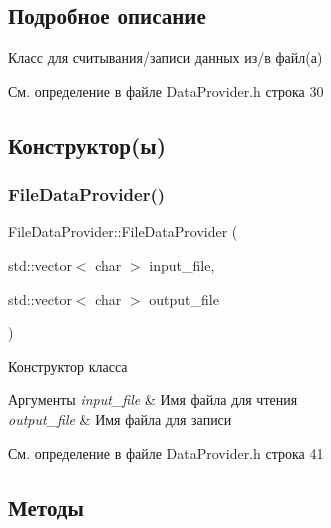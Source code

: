 \subsection{Подробное описание}
Класс для считывания/записи данных из/в файл(а) 

См. определение в файле Data\+Provider.\+h строка 30



\subsection{Конструктор(ы)}
\mbox{\label{class_file_data_provider_a993b0c05a33d57eeb96c9269fc4479a5}} 
\subsubsection{\texorpdfstring{File\+Data\+Provider()}{FileDataProvider()}}
{\footnotesize\ttfamily File\+Data\+Provider\+::\+File\+Data\+Provider (\begin{DoxyParamCaption}\item[{std\+::vector$<$ char $>$}]{input\+\_\+file,  }\item[{std\+::vector$<$ char $>$}]{output\+\_\+file }\end{DoxyParamCaption})\hspace{0.3cm}{\ttfamily [inline]}}



Конструктор класса 


\begin{DoxyParams}{Аргументы}
{\em input\+\_\+file} & Имя файла для чтения \\
\hline
{\em output\+\_\+file} & Имя файла для записи \\
\hline
\end{DoxyParams}


См. определение в файле Data\+Provider.\+h строка 41



\subsection{Методы}
\mbox{\label{class_file_data_provider_a3804f90fbca39fb9d9fa62389152a1a5}} 

